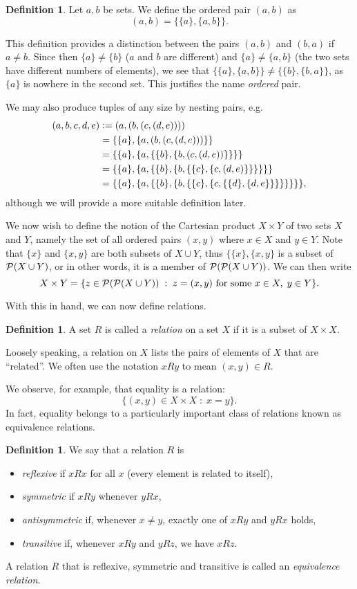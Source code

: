 \documentclass[a4paper, twoside, notitlepage, 11pt]{article}
\theoremstyle{plain}
\theoremstyle{definition}
\newtheorem{definition}[prop]{Definition}
\theoremstyle{remark}
\numberwithin{equation}{section}
\begin{document}
\begin{definition}
Let $a,b$ be sets. We define the ordered pair $(a,b)$ as
\[
    (a,b) = \{ \{a\}, \{a,b\} \}.
\]
\end{definition}
This definition provides a distinction between the pairs $(a,b)$ and $(b,a)$ if $a\neq b$. Since then
$\{a\}\neq\{b\}$ ($a$ and $b$ are different) and $\{a\}\neq\{a,b\}$ (the two sets have different numbers of
elements), we see that $\{\{a\},\{a,b\}\}\neq\{\{b\},\{b,a\}\}$, as $\{a\}$ is nowhere in the second set. This
justifies the name {\em ordered} pair.

We may also produce tuples of any size by nesting pairs, e.g.
\begin{align*}
    (a,b,c,d,e) 
    & \vcentcolon= (a,(b,(c,(d,e)))) \\
    & = \{\{a\},\{a,(b,(c,(d,e)))\}\} \\
    & = \{\{a\},\{a,\{\{b\},\{b,(c,(d,e))\}\}\}\} \\
    & = \{\{a\},\{a,\{\{b\},\{b,\{\{c\},\{c,(d,e)\}\}\}\}\}\} \\
    & = \{\{a\},\{a,\{\{b\},\{b,\{\{c\},\{c,\{\{d\},\{d,e\}\}\}\}\}\}\}\},
\end{align*}
although we will provide a more suitable definition later.

We now wish to define the notion of the Cartesian product $X\times Y$ of two sets $X$ and $Y$, namely the set
of all ordered pairs $(x,y)$ where $x\in X$ and $y\in Y$. Note that $\{x\}$ and $\{x,y\}$ are both subsets of
$X\cup Y$, thus $\{\{x\},\{x,y\}$ is a subset of $\mathcal{P}(X \cup Y)$, or in other words, it is a member of
$\mathcal{P}(\mathcal{P}(X \cup Y))$. We can then write
\[
    X \times Y = \{ z \in \mathcal{P}(\mathcal{P}(X\cup Y)) \;:\; z = (x,y) \text{ for some } x \in X, \; y \in Y \}.
\]

With this in hand, we can now define relations.
\begin{definition}
A set $R$ is called a {\em relation} on a set $X$ if it is a subset of $X \times X$.
\end{definition}
Loosely speaking, a relation on $X$ lists the pairs of elements of $X$ that are ``related''. We often use the
notation $x R y$ to mean $(x,y) \in R$.

We observe, for example, that equality is a relation:
\[
    \{ (x,y) \in X \times X \;:\; x = y \}.
\]
In fact, equality belongs to a particularly important class of relations known as equivalence relations.
\begin{definition}
We say that a relation $R$ is
\begin{itemize}
    \item {\em reflexive} if $xRx$ for all $x$ (every element is related to itself),
    \item {\em symmetric} if $xRy$ whenever $yRx$,
    \item {\em antisymmetric} if, whenever $x \neq y$, exactly one of $xRy$ and $yRx$ holds,
    \item {\em transitive} if, whenever $xRy$ and $yRz$, we have $xRz$.
\end{itemize}
A relation $R$ that is reflexive, symmetric and transitive is called an {\em equivalence relation}.
\end{definition}

\end{document}
